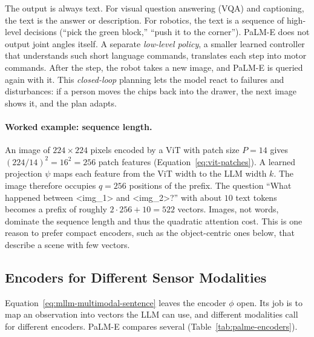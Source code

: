 \noindent
The output is always text. For visual question answering (VQA) and
captioning, the text is the answer or description. For robotics, the text is
a sequence of high-level decisions (``pick the green block,'' ``push it to
the corner''). PaLM-E does not output joint angles itself. A separate
\emph{low-level policy}, a smaller learned controller that understands such
short language commands, translates each step into motor commands. After the
step, the robot takes a new image, and PaLM-E is queried again with it. This
\emph{closed-loop} planning lets the model react to failures and
disturbances: if a person moves the chips back into the drawer, the next
image shows it, and the plan adapts.

\paragraph{Worked example: sequence length.}
An image of $224\times224$ pixels encoded by a ViT with patch size $P=14$
gives $(224/14)^2=16^2=256$ patch features
(Equation~\ref{eq:vit-patches}). A learned projection $\psi$ maps each
feature from the ViT width to the LLM width $k$. The image therefore
occupies $q=256$ positions of the prefix. The question ``What happened
between <img\_1> and <img\_2>?'' with about $10$ text tokens becomes a
prefix of roughly $2\cdot256+10=522$ vectors. Images, not words, dominate the
sequence length and thus the quadratic attention cost. This is one reason to
prefer compact encoders, such as the object-centric ones below, that describe
a scene with few vectors.

\subsection{Encoders for Different Sensor Modalities}

Equation~\ref{eq:mllm-multimodal-sentence} leaves the encoder $\phi$ open.
Its job is to map an observation into vectors the LLM can use, and different
modalities call for different encoders. PaLM-E compares several
(Table~\ref{tab:palme-encoders}).

